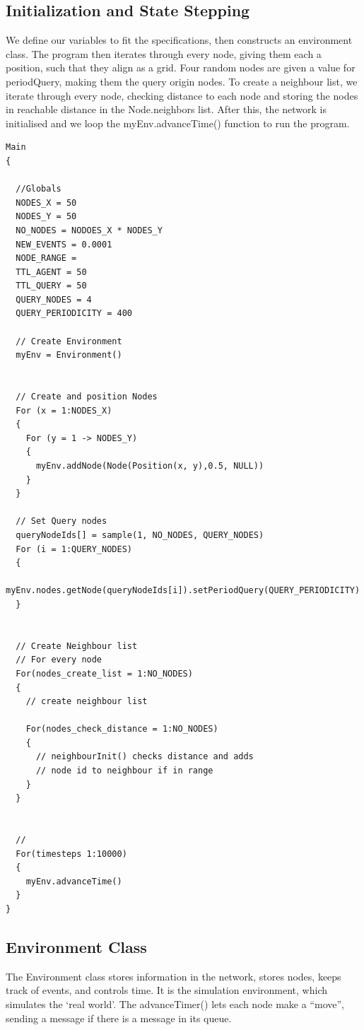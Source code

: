 \documentclass[a4paper,11pt,twoside]{article}
\begin{document}
\subsection{Initialization and State Stepping}
We define our variables to fit the specifications, then constructs an
environment class. The program then iterates through every node,
giving them each a position, such that they align as a grid. Four
random nodes are given a value for periodQuery, making them the query
origin nodes. To create a neighbour list, we iterate through every
node, checking distance to each node and storing the nodes in
reachable distance in the Node.neighbors list. 
After this, the network is initialised and we loop the
myEnv.advanceTime() function to run the program.

\begin{verbatim}
Main
{

  //Globals
  NODES_X = 50
  NODES_Y = 50
  NO_NODES = NODOES_X * NODES_Y
  NEW_EVENTS = 0.0001
  NODE_RANGE = 
  TTL_AGENT = 50
  TTL_QUERY = 50
  QUERY_NODES = 4
  QUERY_PERIODICITY = 400

  // Create Environment
  myEnv = Environment()


  // Create and position Nodes
  For (x = 1:NODES_X)
  {
    For (y = 1 -> NODES_Y)
    {
      myEnv.addNode(Node(Position(x, y),0.5, NULL))
    }
  }

  // Set Query nodes
  queryNodeIds[] = sample(1, NO_NODES, QUERY_NODES)
  For (i = 1:QUERY_NODES)
  {
    myEnv.nodes.getNode(queryNodeIds[i]).setPeriodQuery(QUERY_PERIODICITY)
  }


  // Create Neighbour list
  // For every node
  For(nodes_create_list = 1:NO_NODES)
  {
    // create neighbour list 

    For(nodes_check_distance = 1:NO_NODES)
    {
      // neighbourInit() checks distance and adds 
      // node id to neighbour if in range
    }
  }


  //
  For(timesteps 1:10000)
  {
    myEnv.advanceTime()
  }
}
\end{verbatim}

\subsection{Environment Class}
The Environment class stores information in the network, stores nodes,
keeps track of events, and controls time. It is the simulation
environment, which simulates the ‘real world’. The advanceTimer() lets
each node make a “move”, sending a message if there is a message in
its queue.
\end{document}
